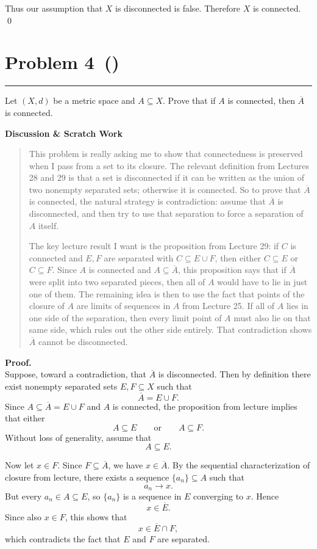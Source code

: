 \documentclass[12pt]{article}
\makeatletter
\newenvironment{scratch}{%
  \par\smallskip
  \noindent\textbf{Discussion \& Scratch Work}\begin{quote}\small
}{%
  \end{quote}\smallskip
}
\newcommand{\problem}[2][]{%
  \def\prob@title{Problem #2\if\relax\detokenize{#1}\relax\else\ (\textit{#1})\fi}%
  \phantomsection%
  \pdfbookmark[1]{\prob@title}{prob#2}%
  \addcontentsline{toc}{section}{\prob@title}%
  \section*{\prob@title}%
  \vspace{-0.25em}\hrule\vspace{0.8em}%
}
\makeatother
\begin{document}
Thus our assumption that $X$ is disconnected is false. Therefore $X$ is connected.
\qed

\newpage

\problem[]{4}
Let $(X,d)$ be a metric space and $A\subseteq X$. Prove that if $A$ is
connected, then $\overline{A}$ is connected.

\begin{scratch}
This problem is really asking me to show that connectedness is preserved when I pass from a set to its closure. The relevant definition from Lectures 28 and 29 is that a set is disconnected if it can be written as the union of two nonempty separated sets; otherwise it is connected. So to prove that $\overline{A}$ is connected, the natural strategy is contradiction: assume that $\overline{A}$ is disconnected, and then try to use that separation to force a separation of $A$ itself.

The key lecture result I want is the proposition from Lecture 29: if $C$ is connected and $E,F$ are separated with $C\subseteq E\cup F$, then either $C\subseteq E$ or $C\subseteq F$. Since $A$ is connected and $A\subseteq\overline{A}$, this proposition says that if $\overline{A}$ were split into two separated pieces, then all of $A$ would have to lie in just one of them. The remaining idea is then to use the fact that points of the closure of $A$ are limits of sequences in $A$ from Lecture 25. If all of $A$ lies in one side of the separation, then every limit point of $A$ must also lie on that same side, which rules out the other side entirely. That contradiction shows $\overline{A}$ cannot be disconnected.
\end{scratch}

\textbf{Proof.}\\
Suppose, toward a contradiction, that $\overline{A}$ is disconnected. Then by definition there exist nonempty separated sets $E,F\subseteq X$ such that
\[
\overline{A}=E\cup F.
\]
Since $A\subseteq\overline{A}=E\cup F$ and $A$ is connected, the proposition from lecture implies that either
\[
A\subseteq E
\qquad\text{or}\qquad
A\subseteq F.
\]
Without loss of generality, assume that
\[
A\subseteq E.
\]

Now let $x\in F$. Since $F\subseteq\overline{A}$, we have $x\in\overline{A}$. By the sequential characterization of closure from lecture, there exists a sequence $\{a_n\}\subseteq A$ such that
\[
a_n\to x.
\]
But every $a_n\in A\subseteq E$, so $\{a_n\}$ is a sequence in $E$ converging to $x$. Hence
\[
x\in\overline{E}.
\]
Since also $x\in F$, this shows that
\[
x\in\overline{E}\cap F,
\]
which contradicts the fact that $E$ and $F$ are separated.
\end{document}
